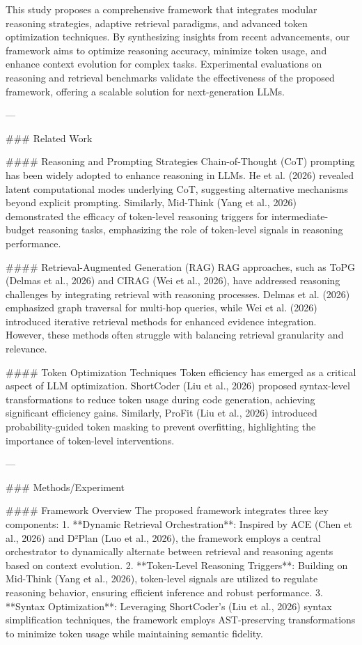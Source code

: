 This study proposes a comprehensive framework that integrates modular reasoning strategies, adaptive retrieval paradigms, and advanced token optimization techniques. By synthesizing insights from recent advancements, our framework aims to optimize reasoning accuracy, minimize token usage, and enhance context evolution for complex tasks. Experimental evaluations on reasoning and retrieval benchmarks validate the effectiveness of the proposed framework, offering a scalable solution for next-generation LLMs.

---

### Related Work

#### Reasoning and Prompting Strategies
Chain-of-Thought (CoT) prompting has been widely adopted to enhance reasoning in LLMs. He et al. (2026) revealed latent computational modes underlying CoT, suggesting alternative mechanisms beyond explicit prompting. Similarly, Mid-Think (Yang et al., 2026) demonstrated the efficacy of token-level reasoning triggers for intermediate-budget reasoning tasks, emphasizing the role of token-level signals in reasoning performance.

#### Retrieval-Augmented Generation (RAG)
RAG approaches, such as ToPG (Delmas et al., 2026) and CIRAG (Wei et al., 2026), have addressed reasoning challenges by integrating retrieval with reasoning processes. Delmas et al. (2026) emphasized graph traversal for multi-hop queries, while Wei et al. (2026) introduced iterative retrieval methods for enhanced evidence integration. However, these methods often struggle with balancing retrieval granularity and relevance.

#### Token Optimization Techniques
Token efficiency has emerged as a critical aspect of LLM optimization. ShortCoder (Liu et al., 2026) proposed syntax-level transformations to reduce token usage during code generation, achieving significant efficiency gains. Similarly, ProFit (Liu et al., 2026) introduced probability-guided token masking to prevent overfitting, highlighting the importance of token-level interventions.

---

### Methods/Experiment

#### Framework Overview
The proposed framework integrates three key components:
1. **Dynamic Retrieval Orchestration**: Inspired by ACE (Chen et al., 2026) and D²Plan (Luo et al., 2026), the framework employs a central orchestrator to dynamically alternate between retrieval and reasoning agents based on context evolution.
2. **Token-Level Reasoning Triggers**: Building on Mid-Think (Yang et al., 2026), token-level signals are utilized to regulate reasoning behavior, ensuring efficient inference and robust performance.
3. **Syntax Optimization**: Leveraging ShortCoder's (Liu et al., 2026) syntax simplification techniques, the framework employs AST-preserving transformations to minimize token usage while maintaining semantic fidelity.

